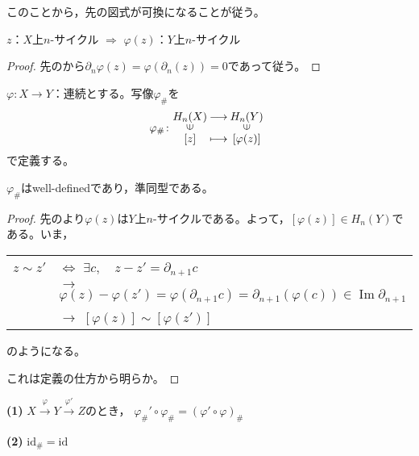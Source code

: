 \documentclass[uplatex]{jsarticle}
\DeclareMathOperator{\Image}{Im}
\begin{document}
このことから，先の図式が可換になることが従う。

\begin{hodai}
  \label{homology1.cycle}
  $z$：$X$上$n$-サイクル $\Longrightarrow$ $\varphi(z)$：$Y$上$n$-サイクル
\end{hodai}

\begin{proof}
  先のから$\partial_{n} \varphi(z) = \varphi (\partial_{n} (z)) = 0$であって従う。
\end{proof}

\begin{teigi}
  $\varphi \colon X \longrightarrow Y$：連続とする。写像$\varphi_{\#}$を
  \begin{equation}
    \varphi_{\#} \colon \mapdef{H_{n}(X)}{H_{n}(Y)}{\left[ z \right]}{\left[ \varphi(z) \right]}
  \end{equation}
  で定義する。
\end{teigi}

\begin{hodai}
  $\varphi_{\#}$はwell-definedであり，準同型である。
\end{hodai}

\begin{proof}

  先のより$\varphi(z)$は$Y$上$n$-サイクルである。よって，$[\varphi(z)] \in H_{n}(Y)$である。いま，
  \renewcommand{\arraystretch}{1}
  \begin{tabular}{l@{\,}l}
    $z \sim z'$ & $\Longleftrightarrow$ $\exists c, \quad z - z' = \partial_{n+1} c$ \\
    & $\longrightarrow$ $\varphi(z) - \varphi(z') = \varphi (\partial_{n+1} c) = \partial_{n+1} (\varphi(c)) \in \Image \partial_{n+1}$ \\
    & $\longrightarrow$ $[\varphi(z)] \sim [\varphi(z')]$
  \end{tabular}
  \renewcommand{\arraystretch}{1.3}
  のようになる。

  \sukima {}

  これは定義の仕方から明らか。
\end{proof}

\begin{hodai}
  {\bf (1)} $X \xrightarrow{\varphi} Y \xrightarrow{\varphi'} Z$のとき，
  $\varphi_{\#}' \circ \varphi_{\#} = (\varphi' \circ \varphi)_{\#}$

  {\bf (2)} $\mathrm{id}_{\#} = \mathrm{id}$
\end{hodai}
\end{document}
